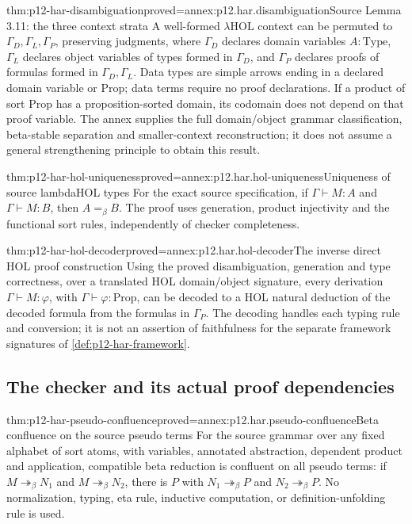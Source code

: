 \begin{hblemma}{thm:p12-har-disambiguation}{proved=annex:p12.har.disambiguation}{Source Lemma 3.11: the three context strata}
A well-formed \(\lambda\mathrm{HOL}\) context can be permuted to
\(\Gamma_D,\Gamma_L,\Gamma_P\), preserving judgments, where
\(\Gamma_D\) declares domain variables \(A:\mathrm{Type}\),
\(\Gamma_L\) declares object variables of types formed in
\(\Gamma_D\), and \(\Gamma_P\) declares proofs of formulas
formed in \(\Gamma_D,\Gamma_L\). Data types are simple arrows
ending in a declared domain variable or \(\mathrm{Prop}\); data
terms require no proof declarations. If a product of sort
\(\mathrm{Prop}\) has a proposition-sorted domain, its codomain
does not depend on that proof variable. The annex supplies the full
domain/object grammar classification, beta-stable separation and
smaller-context reconstruction; it does not assume a general
strengthening principle to obtain this result.
\end{hblemma}

\begin{hblemma}{thm:p12-har-hol-uniqueness}{proved=annex:p12.har.hol-uniqueness}{Uniqueness of source lambdaHOL types}
For the exact source specification, if
\(\Gamma\vdash M:A\) and \(\Gamma\vdash M:B\), then
\(A=_\beta B\). The proof uses generation, product injectivity
and the functional sort rules, independently of checker completeness.
\end{hblemma}

\begin{hbtheorem}{thm:p12-har-hol-decoder}{proved=annex:p12.har.hol-decoder}{The inverse direct HOL proof construction}
Using the proved disambiguation, generation and type correctness,
over a translated HOL domain/object signature,
every derivation \(\Gamma\vdash M:\varphi\), with
\(\Gamma\vdash\varphi:\mathrm{Prop}\), can be decoded to a
HOL natural deduction of the decoded formula from the formulas in
\(\Gamma_P\). The decoding handles each typing rule and conversion;
it is not an assertion of faithfulness for the separate framework
signatures of \cref{def:p12-har-framework}.
\end{hbtheorem}

\subsection{The checker and its actual proof dependencies}

\begin{hbtheorem}{thm:p12-har-pseudo-confluence}{proved=annex:p12.har.pseudo-confluence}{Beta confluence on the source pseudo terms}
For the source grammar over any fixed alphabet of sort atoms, with
variables, annotated abstraction,
dependent product and application, compatible beta reduction is confluent
on all pseudo terms: if \(M\twoheadrightarrow_\beta N_1\) and
\(M\twoheadrightarrow_\beta N_2\), there is \(P\) with
\(N_1\twoheadrightarrow_\beta P\) and
\(N_2\twoheadrightarrow_\beta P\). No normalization, typing,
eta rule, inductive computation, or definition-unfolding rule is used.
\end{hbtheorem}

